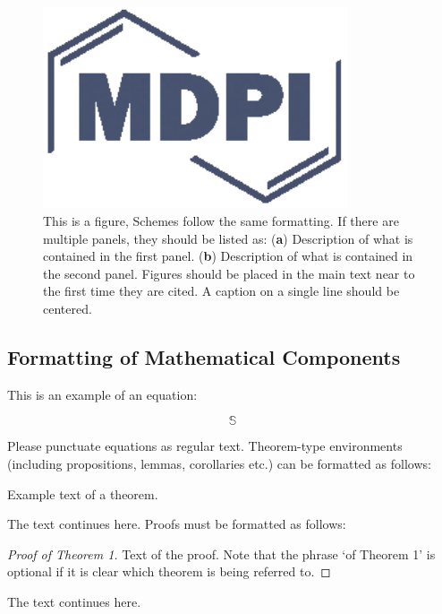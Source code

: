 \documentclass[entropy,article,submit,moreauthors,pdftex,10pt,a4paper]{mdpi}
\begin{document}
\begin{figure}[H]
\centering
\includegraphics[width=9cm]{subjectaveraged.eps}
\caption{This is a figure, Schemes follow the same formatting. If there are multiple panels, they should be listed as: (\textbf{a}) Description of what is contained in the first panel. (\textbf{b}) Description of what is contained in the second panel. Figures should be placed in the main text near to the first time they are cited. A caption on a single line should be centered.}
\end{figure}   


\subsection{Formatting of Mathematical Components}

This is an example of an equation:

\begin{equation}
\mathbb{S}
\end{equation}

Please punctuate equations as regular text. Theorem-type environments (including propositions, lemmas, corollaries etc.) can be formatted as follows:
\begin{Theorem}
Example text of a theorem.
\end{Theorem}

The text continues here. Proofs must be formatted as follows:

\begin{proof}[Proof of Theorem 1]
Text of the proof. Note that the phrase `of Theorem 1' is optional if it is clear which theorem is being referred to.
\end{proof}
The text continues here.
\end{document}
